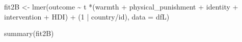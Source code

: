 \documentclass[
  letterpaper,
  DIV=11,
  numbers=noendperiod]{scrreprt}
\newenvironment{Shaded}{\begin{snugshade}}{\end{snugshade}}
\newcommand{\AttributeTok}[1]{\textcolor[rgb]{0.40,0.45,0.13}{#1}}
\newcommand{\DecValTok}[1]{\textcolor[rgb]{0.68,0.00,0.00}{#1}}
\newcommand{\FunctionTok}[1]{\textcolor[rgb]{0.28,0.35,0.67}{#1}}
\newcommand{\NormalTok}[1]{\textcolor[rgb]{0.00,0.23,0.31}{#1}}
\newcommand{\OtherTok}[1]{\textcolor[rgb]{0.00,0.23,0.31}{#1}}
\newcommand{\SpecialCharTok}[1]{\textcolor[rgb]{0.37,0.37,0.37}{#1}}
\begin{document}
\begin{Shaded}
\begin{Highlighting}[]
\NormalTok{fit2B }\OtherTok{\textless{}{-}} \FunctionTok{lmer}\NormalTok{(outcome }\SpecialCharTok{\textasciitilde{}}\NormalTok{ t }\SpecialCharTok{*}\NormalTok{(warmth }\SpecialCharTok{+}\NormalTok{ physical\_punishment }\SpecialCharTok{+} 
\NormalTok{               identity }\SpecialCharTok{+}\NormalTok{ intervention }\SpecialCharTok{+}\NormalTok{ HDI) }\SpecialCharTok{+}
\NormalTok{               (}\DecValTok{1} \SpecialCharTok{|}\NormalTok{ country}\SpecialCharTok{/}\NormalTok{id),}
             \AttributeTok{data =}\NormalTok{ dfL)}

\FunctionTok{summary}\NormalTok{(fit2B)}
\end{Highlighting}
\end{Shaded}
\end{document}
